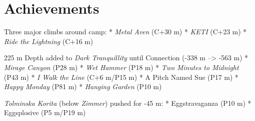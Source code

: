 \section{Achievements}

Three major climbs around camp: * \emph{Metal Aven} (C+30 m) *
\emph{KETI} (C+23 m) * \emph{Ride the Lightning} (C+16 m)

225 m Depth added to \emph{Dark Tranquillity} until Connection (-338 m
--\textgreater{} -563 m) * \emph{Mirage Canyon} (P28 m) * \emph{Wet
Hammer} (P18 m) * \emph{Two Minutes to Midnight} (P43 m) * \emph{I Walk
the Line} (C+6 m/P15 m) * A Pitch Named Sue (P17 m) * \emph{Happy
Monday} (P81 m) * \emph{Hanging Garden} (P10 m)

\emph{Tolminska Korita} (below \emph{Zimmer}) pushed for -45 m: *
Eggstravaganza (P10 m) * Eggsplosive (P5 m/P19 m)
